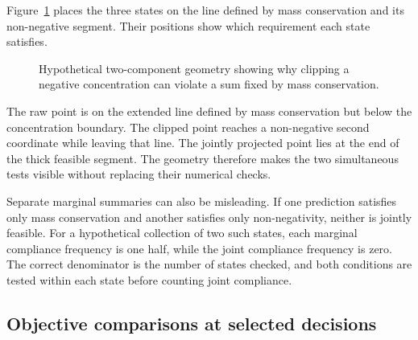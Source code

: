 Figure~\ref{fig:assessment_feasible_segment} places the three states on the line defined by mass conservation and its non-negative segment. Their positions show which requirement each state satisfies.

\begin{figure}[htbp]
\centering
{}
\caption{Hypothetical two-component geometry showing why clipping a negative concentration can violate a sum fixed by mass conservation.}
\label{fig:assessment_feasible_segment}
\end{figure}

The raw point is on the extended line defined by mass conservation but below the concentration boundary. The clipped point reaches a non-negative second coordinate while leaving that line. The jointly projected point lies at the end of the thick feasible segment. The geometry therefore makes the two simultaneous tests visible without replacing their numerical checks.

Separate marginal summaries can also be misleading. If one prediction satisfies only mass conservation and another satisfies only non-negativity, neither is jointly feasible. For a hypothetical collection of two such states, each marginal compliance frequency is one half, while the joint compliance frequency is zero. The correct denominator is the number of states checked, and both conditions are tested within each state before counting joint compliance.

\subsection{Objective comparisons at selected decisions}


